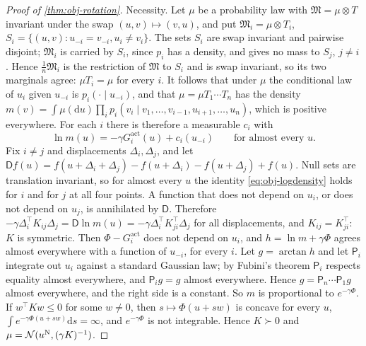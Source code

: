 \begin{proof}[Proof of \cref{thm:obj-rotation}]
Necessity. Let $\mu$ be a probability law with $\mathfrak M=\mu\otimes T$ invariant under the swap $(u,v)\mapsto(v,u)$, and put $\mathfrak M_i=\mu\otimes T_i$, $S_i=\{(u,v):u_{-i}=v_{-i},u_i\neq v_i\}$. The sets $S_i$ are swap invariant and pairwise disjoint; $\mathfrak M_i$ is carried by $S_i$, since $p_i$ has a density, and gives no mass to $S_j$, $j\neq i$. Hence $\frac1n\mathfrak M_i$ is the restriction of $\mathfrak M$ to $S_i$ and is swap invariant, so its two marginals agree: $\mu T_i=\mu$ for every $i$. It follows that under $\mu$ the conditional law of $u_i$ given $u_{-i}$ is $p_i(\cdot\mid u_{-i})$, and that $\mu=\mu T_1\cdots T_n$ has the density $m(v)=\int\mu(\mathrm du)\prod_ip_i(v_i\mid v_1,\dots,v_{i-1},u_{i+1},\dots,u_n)$, which is positive everywhere. For each $i$ there is therefore a measurable $c_i$ with
\begin{equation}\label{eq:obj-logdensity}
\ln m(u)=-\gamma G^{\mathrm{act}}_i(u)+c_i(u_{-i})\qquad\text{for almost every }u.
\end{equation}
Fix $i\neq j$ and displacements $\Delta_i,\Delta_j$, and let $\mathsf Df(u)=f(u+\Delta_i+\Delta_j)-f(u+\Delta_i)-f(u+\Delta_j)+f(u)$. Null sets are translation invariant, so for almost every $u$ the identity \eqref{eq:obj-logdensity} holds for $i$ and for $j$ at all four points. A function that does not depend on $u_i$, or does not depend on $u_j$, is annihilated by $\mathsf D$. Therefore $-\gamma\Delta_i^\top K_{ij}\Delta_j=\mathsf D\ln m(u)=-\gamma\Delta_i^\top K_{ji}^\top\Delta_j$ for all displacements, and $K_{ij}=K_{ji}^\top$: $K$ is symmetric. Then $\Phi-G^{\mathrm{act}}_i$ does not depend on $u_i$, and $h=\ln m+\gamma\Phi$ agrees almost everywhere with a function of $u_{-i}$, for every $i$. Let $g=\arctan h$ and let $\mathsf P_i$ integrate out $u_i$ against a standard Gaussian law; by Fubini's theorem $\mathsf P_i$ respects equality almost everywhere, and $\mathsf P_ig=g$ almost everywhere. Hence $g=\mathsf P_n\cdots\mathsf P_1g$ almost everywhere, and the right side is a constant. So $m$ is proportional to $e^{-\gamma\Phi}$. If $w^\top Kw\le0$ for some $w\neq0$, then $s\mapsto\Phi(u+sw)$ is concave for every $u$, $\int e^{-\gamma\Phi(u+sw)}\mathrm ds=\infty$, and $e^{-\gamma\Phi}$ is not integrable. Hence $K\succ0$ and $\mu=\mathcal{N}(u^{\mathrm N},(\gamma K)^{-1})$.


\end{proof}
